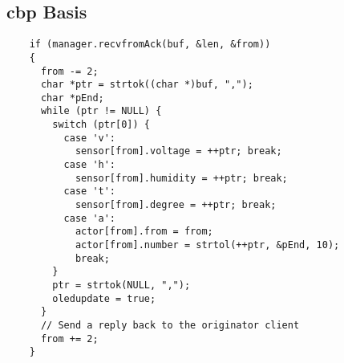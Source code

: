 \subsection{cbp Basis}
\label{cbp basis}
\begin{verbatim}
    if (manager.recvfromAck(buf, &len, &from))
    {
      from -= 2;
      char *ptr = strtok((char *)buf, ",");
      char *pEnd;
      while (ptr != NULL) {
        switch (ptr[0]) {
          case 'v':
            sensor[from].voltage = ++ptr; break;
          case 'h':
            sensor[from].humidity = ++ptr; break;
          case 't':
            sensor[from].degree = ++ptr; break;
          case 'a':
            actor[from].from = from;
            actor[from].number = strtol(++ptr, &pEnd, 10);
            break;
        }
        ptr = strtok(NULL, ",");
        oledupdate = true;
      }
      // Send a reply back to the originator client
      from += 2;
    }
\end{verbatim}